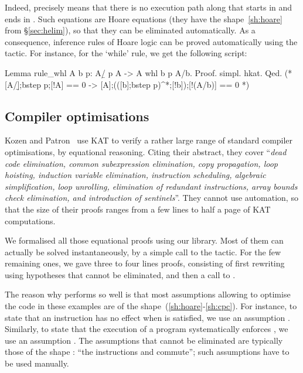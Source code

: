 \documentclass[a4paper]{llncs}
\begin{document}
Indeed,  precisely means that there is no execution
path along  that starts in  and ends in .
Such equations are Hoare equations (they have the
shape~\eqref{sh:hoare} from §\ref{sec:helim}), so that they can be
eliminated automatically. As a consequence, inference rules of Hoare
logic can be proved automatically using the  tactic.
For instance, for the `while' rule, we get the following script:
\begin{coq}
Lemma rule_whl A b p: {A/\b} p {A} -> {A} whl b p {A/\!b}.
Proof. simpl. hkat. Qed.
(* [A/\b];bstep p;[!A] == 0 -> [A];(([b];bstep p)^*;[!b]);[!(A/\!b)] == 0 *)
\end{coq}


\subsection{Compiler optimisations}
\label{sec:compiler:opts}

Kozen and Patron~\cite{kozenp00:kat:compiler:opts} use KAT to verify a
rather large range of standard compiler optimisations, by equational
reasoning. Citing their abstract, they cover ``\emph{dead code
  elimination, common subexpression elimination, copy propagation,
  loop hoisting, induction variable elimination, instruction
  scheduling, algebraic simplification, loop unrolling, elimination of
  redundant instructions, array bounds check elimination, and
  introduction of sentinels}''. They cannot use automation, so that
the size of their proofs ranges from a few lines to half a page of KAT
computations.

We formalised all those equational proofs using our library. Most of
them can actually be solved instantaneously, by a simple call to the
 tactic.
For the few remaining ones, we gave three to four lines proofs,
consisting of first rewriting using hypotheses that cannot be
eliminated, and then a call to .

The reason why  performs so well is that most assumptions
allowing to optimise the code in these examples are of the
shape~(\ref{sh:hoare}-\ref{sh:cpc}). For instance, to state that an
instruction  has no effect when  is satisfied, we use an
assumption . Similarly, to state that the execution of a
program  systematically enforces , we use an assumption
.
The assumptions that cannot be eliminated are typically those of the
shape : ``the instructions  and  commute''; such
assumptions have to be used manually.
\end{document}
